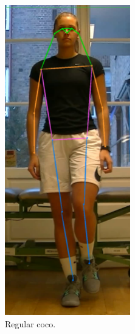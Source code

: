 \begin{figure}
 \centering
 \begin{subfigure}[t]{0.45\textwidth}
   \centering
  \includegraphics[width=0.6\textwidth]{files/figs/hpe/coco.png}
  \caption{Regular \gls{coco}.}
  \label{fig:coco}
 \end{subfigure}
 ~
 \begin{subfigure}[t]{0.45\textwidth}
   \centering

\end{subfigure}
\end{figure}
